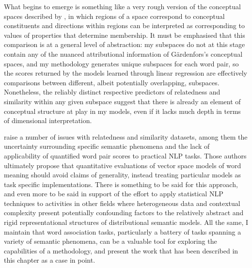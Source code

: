 
What begins to emerge is something like a very rough version of the conceptual spaces described by \cite{Gardenfors2000}, in which regions of a space correspond to conceptual constituents and directions within regions can be interpreted as corresponding to values of properties that determine membership.  It must be emphasised that this comparison is at a general level of abstraction: my subspaces do not at this stage contain any of the nuanced attributional information of G\"{a}rdenfors's conceptual spaces, and my methodology generates unique subspaces for each word pair, so the scores returned by the models learned through linear regression are effectively comparisons between different, albeit potentially overlapping, subspaces.  Nonetheless, the reliably distinct respective predictors of relatedness and similarity within any given subspace suggest that there is already an element of conceptual structure at play in my models, even if it lacks much depth in terms of dimensional interpretation.

\cite{FaruquiEA2016} raise a number of issues with relatedness and similarity datasets, among them the uncertainty surrounding specific semantic phenomena and the lack of applicability of quantified word pair scores to practical NLP tasks.  Those authors ultimately propose that quantitative evaluations of vector space models of word meaning should avoid claims of generality, instead treating particular models as task specific implementations.  There is something to be said for this approach, and even more to be said in support of the effort to apply statistical NLP techniques to activities in other fields where heterogeneous data and contextual complexity present potentially confounding factors to the relatively abstract and rigid representational structures of distributional semantic models.  All the same, I maintain that word association tasks, particularly a battery of tasks spanning a variety of semantic phenomena, can be a valuable tool for exploring the capabilities of a methodology, and present the work that has been described in this chapter as a case in point.

